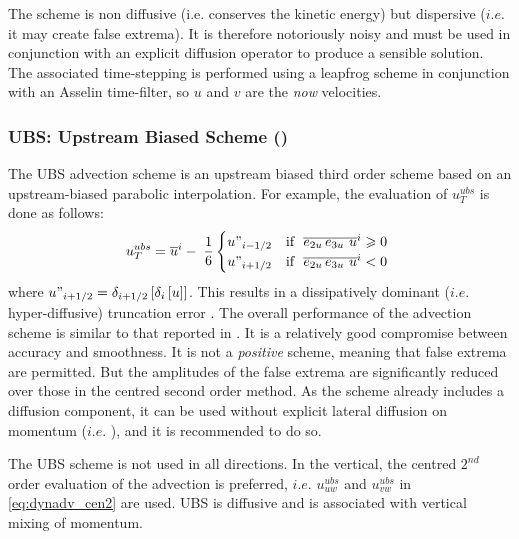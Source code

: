 \documentclass[../tex_main/NEMO_manual]{subfiles}
\begin{document}
The scheme is non diffusive (i.e. conserves the kinetic energy) but dispersive 
($i.e.$ it may create false extrema). It is therefore notoriously noisy and must be 
used in conjunction with an explicit diffusion operator to produce a sensible solution. 
The associated time-stepping is performed using a leapfrog scheme in conjunction 
with an Asselin time-filter, so $u$ and $v$ are the \emph{now} velocities.

\subsubsection{UBS: Upstream Biased Scheme (\protect{})}
\label{subsec:DYN_adv_ubs}

The UBS advection scheme is an upstream biased third order scheme based on 
an upstream-biased parabolic interpolation. For example, the evaluation of 
$u_T^{ubs} $ is done as follows:
\begin{equation} \label{eq:dynadv_ubs}
u_T^{ubs} =\overline u ^i-\;\frac{1}{6} 	\begin{cases}
		u"_{i-1/2}& 	\text{if $\ \overline{e_{2u}\,e_{3u} \ u}^i  \geqslant 0$ } 	\\
		u"_{i+1/2}& 	\text{if $\ \overline{e_{2u}\,e_{3u} \ u}^i  < 0$ }
\end{cases}
\end{equation}
where $u"_{i+1/2} =\delta _{i+1/2} \left[ {\delta _i \left[ u \right]} \right]$. This results 
in a dissipatively dominant ($i.e.$ hyper-diffusive) truncation error \citep{Shchepetkin_McWilliams_OM05}. 
The overall performance of the advection scheme is similar to that reported in 
\citet{Farrow1995}. It is a relatively good compromise between accuracy and 
smoothness. It is not a \emph{positive} scheme, meaning that false extrema are 
permitted. But the amplitudes of the false extrema are significantly reduced over 
those in the centred second order method. As the scheme already includes 
a diffusion component, it can be used without explicit lateral diffusion on momentum 
($i.e.$ \forcode{ = }), and it is recommended to do so.

The UBS scheme is not used in all directions. In the vertical, the centred $2^{nd}$ 
order evaluation of the advection is preferred, $i.e.$ $u_{uw}^{ubs}$ and 
$u_{vw}^{ubs}$ in \autoref{eq:dynadv_cen2} are used. UBS is diffusive and is 
associated with vertical mixing of momentum. 
\end{document}
